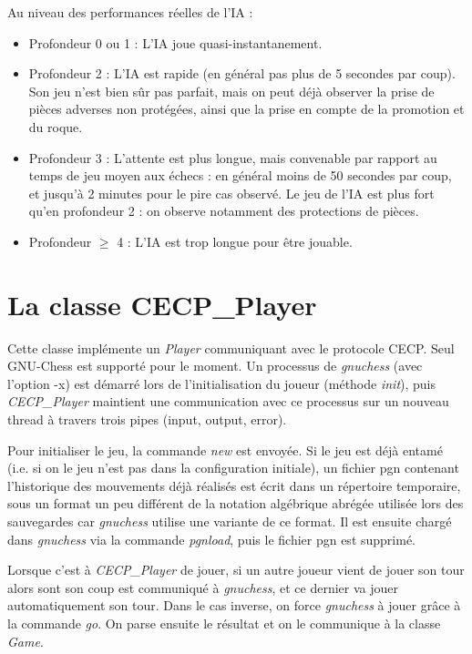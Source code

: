 \documentclass[11pt]{article}
\begin{document}
\-

Au niveau des performances réelles de l'IA :
\begin{itemize}
\item Profondeur 0 ou 1 : L'IA joue quasi-instantanement.
\item Profondeur 2 : L'IA est rapide (en général pas plus de 5 secondes par coup). Son jeu n'est bien sûr pas parfait, mais on peut déjà observer la prise de pièces adverses non protégées, ainsi que la prise en compte de la promotion et du roque.
\item Profondeur 3 : L'attente est plus longue, mais convenable par rapport au temps de jeu moyen aux échecs : en général moins de 50 secondes par coup, et jusqu'à 2 minutes pour le pire cas observé. Le jeu de l'IA est plus fort qu'en profondeur 2 : on observe notamment des protections de pièces.
\item Profondeur $\geq$ 4 : L'IA est trop longue pour être jouable.
\end{itemize}

\section{La classe CECP\_Player}

Cette classe implémente un \textit{Player} communiquant avec le protocole CECP. Seul GNU-Chess est supporté pour le moment.
Un processus de \textsl{gnuchess} (avec l'option -x) est démarré lors de l'initialisation du joueur (méthode \textit{init}),
puis \textit{CECP\_Player} maintient une communication avec ce processus sur un nouveau thread à travers trois pipes (input, output, error).

\-

Pour initialiser le jeu, la commande \textit{new} est envoyée. Si le jeu est déjà entamé (i.e. si on le jeu n'est pas dans la configuration initiale), un fichier pgn contenant l'historique des mouvements déjà réalisés est écrit dans un répertoire temporaire,
sous un format un peu différent de la notation algébrique abrégée utilisée lors des sauvegardes car \textit{gnuchess} utilise une variante de ce format. Il est ensuite chargé dans \textit{gnuchess} via la commande \textit{pgnload}, puis le fichier pgn est supprimé.

\-

Lorsque c'est à \textit{CECP\_Player} de jouer, si un autre joueur vient de jouer son tour alors sont son coup est communiqué à \textit{gnuchess}, et ce dernier va jouer automatiquement son tour. Dans le cas inverse, on force \textit{gnuchess} à jouer grâce à la commande \textit{go}. On parse ensuite le résultat et on le communique à la classe \textit{Game}.
\end{document}
